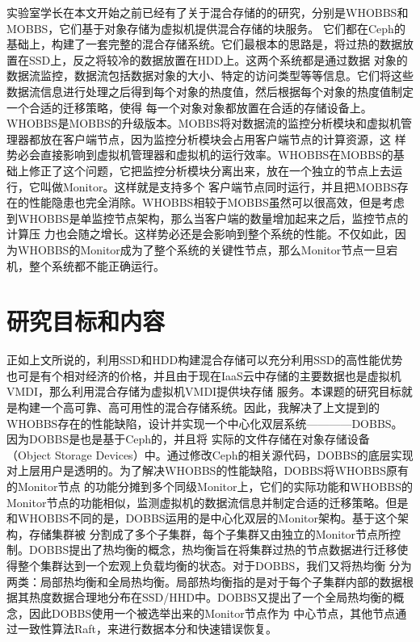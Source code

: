 实验室学长在本文开始之前已经有了关于混合存储的的研究，分别是WHOBBS\cite{lingxuan2015whobbs}和MOBBS\cite{ma2014mobbs}，它们基于对象存储为虚拟机提供混合存储的块服务。
它们都在Ceph\cite{weil2006ceph}的基础上，构建了一套完整的混合存储系统。它们最根本的思路是，将过热的数据放置在SSD上，反之将较冷的数据放置在HDD上。这两个系统都是通过数据
对象的数据流监控，数据流包括数据对象的大小、特定的访问类型等等信息。它们将这些数据流信息进行处理之后得到每个对象的热度值，然后根据每个对象的热度值制定一个合适的迁移策略，使得
每一个对象对象都放置在合适的存储设备上。WHOBBS是MOBBS的升级版本。MOBBS将对数据流的监控分析模块和虚拟机管理器都放在客户端节点，因为监控分析模块会占用客户端节点的计算资源，这
样势必会直接影响到虚拟机管理器和虚拟机的运行效率。WHOBBS在MOBBS的基础上修正了这个问题，它把监控分析模块分离出来，放在一个独立的节点上去运行，它叫做Monitor。这样就是支持多个
客户端节点同时运行，并且把MOBBS存在的性能隐患也完全消除。WHOBBS相较于MOBBS虽然可以很高效，但是考虑到WHOBBS是单监控节点架构，那么当客户端的数量增加起来之后，监控节点的计算压
力也会随之增长。这样势必还是会影响到整个系统的性能。不仅如此，因为WHOBBS的Monitor成为了整个系统的关键性节点，那么Monitor节点一旦宕机，整个系统都不能正确运行。

\section{研究目标和内容}
正如上文所说的，利用SSD和HDD构建混合存储可以充分利用SSD的高性能优势也可是有个相对经济的价格，并且由于现在IaaS云中存储的主要数据也是虚拟机VMDI，那么利用混合存储为虚拟机VMDI提供块存储
服务。本课题的研究目标就是构建一个高可靠、高可用性的混合存储系统。因此，我解决了上文提到的WHOBBS存在的性能缺陷，设计并实现一个中心化双层系统————DOBBS。因为DOBBS是也是基于Ceph的，并且将
实际的文件存储在对象存储设备（Object Storage Devices）中。通过修改Ceph的相关源代码，DOBBS的底层实现对上层用户是透明的。为了解决WHOBBS的性能缺陷，DOBBS将WHOBBS原有的Monitor节点
的功能分摊到多个同级Monitor上，它们的实际功能和WHOBBS的Monitor节点的功能相似，监测虚拟机的数据流信息并制定合适的迁移策略。但是和WHOBBS不同的是，DOBBS运用的是中心化双层的Monitor架构。基于这个架构，存储集群被
分割成了多个子集群，每个子集群又由独立的Monitor节点所控制。DOBBS提出了热均衡的概念，热均衡旨在将集群过热的节点数据进行迁移使得整个集群达到一个宏观上负载均衡的状态。对于DOBBS，我们又将热均衡
分为两类：局部热均衡和全局热均衡。局部热均衡指的是对于每个子集群内部的数据根据其热度数据合理地分布在SSD/HHD中。DOBBS又提出了一个全局热均衡的概念，因此DOBBS使用一个被选举出来的Monitor节点作为
中心节点，其他节点通过一致性算法Raft\cite{ongaro2014search}，来进行数据本分和快速错误恢复。

